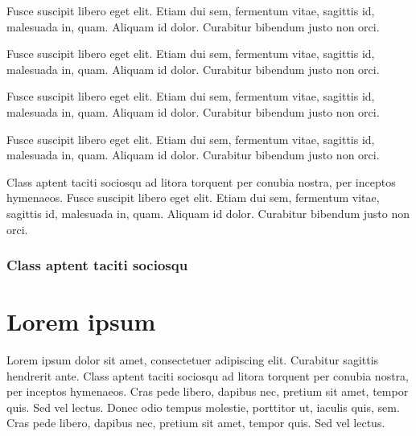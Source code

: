 \begin{corollary}
  Fusce suscipit libero eget elit. Etiam dui sem, fermentum vitae, sagittis id, malesuada in, quam. Aliquam id dolor. Curabitur bibendum justo non orci.
\end{corollary}

\begin{proposition}
  Fusce suscipit libero eget elit. Etiam dui sem, fermentum vitae, sagittis id, malesuada in, quam. Aliquam id dolor. Curabitur bibendum justo non orci.
\end{proposition}

\begin{note}
  Fusce suscipit libero eget elit. Etiam dui sem, fermentum vitae, sagittis id, malesuada in, quam. Aliquam id dolor. Curabitur bibendum justo non orci.
\end{note}

\begin{remark}
  Fusce suscipit libero eget elit. Etiam dui sem, fermentum vitae, sagittis id, malesuada in, quam. Aliquam id dolor. Curabitur bibendum justo non orci.
\end{remark}

\begin{lemma}
  Class aptent taciti sociosqu ad litora torquent per conubia nostra, per inceptos hymenaeos. Fusce suscipit libero eget elit. Etiam dui sem, fermentum vitae, sagittis id, malesuada in, quam. Aliquam id dolor. Curabitur bibendum justo non orci.
\end{lemma}

\lipsum[1-2]

\subsection{Class aptent taciti sociosqu}

\lipsum[4-5]

\chapter{Lorem ipsum}

\begin{chapterabstract}
  Lorem ipsum dolor sit amet, consectetuer adipiscing elit. Curabitur sagittis hendrerit ante. Class aptent taciti sociosqu ad litora torquent per conubia nostra, per inceptos hymenaeos. Cras pede libero, dapibus nec, pretium sit amet, tempor quis. Sed vel lectus. Donec odio tempus molestie, porttitor ut, iaculis quis, sem. Cras pede libero, dapibus nec, pretium sit amet, tempor quis. Sed vel lectus.
\end{chapterabstract}

